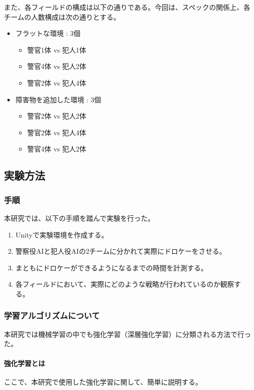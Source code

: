 \documentclass[dvipdfmx]{jsarticle}
\begin{document}
        また、各フィールドの構成は以下の通りである。今回は、スペックの関係上、各チームの人数構成は次の通りとする。
        \begin{itemize}
            \item フラットな環境 : 3個
            \begin{itemize}
                \item 警官1体 vs 犯人1体
                \item 警官4体 vs 犯人2体
                \item 警官2体 vs 犯人4体
            \end{itemize}
            \item 障害物を追加した環境 : 3個
            \begin{itemize}
                \item 警官2体 vs 犯人2体
                \item 警官2体 vs 犯人4体
                \item 警官4体 vs 犯人2体
            \end{itemize}
        \end{itemize}
    \subsection{実験方法}
        \subsubsection{手順}
            本研究では、以下の手順を踏んで実験を行った。
            \begin{enumerate}
                \item Unityで実験環境を作成する。
                \item 警察役AIと犯人役AIの2チームに分かれて実際にドロケーをさせる。
                \item まともにドロケーができるようになるまでの時間を計測する。
                \item 各フィールドにおいて、実際にどのような戦略が行われているのか観察する。
            \end{enumerate}
        \subsubsection{学習アルゴリズムについて}
        本研究では機械学習の中でも強化学習（深層強化学習）に分類される方法で行った。\par 
        \paragraph{強化学習とは} ここで、本研究で使用した強化学習に関して、簡単に説明する。
        
\end{document}
